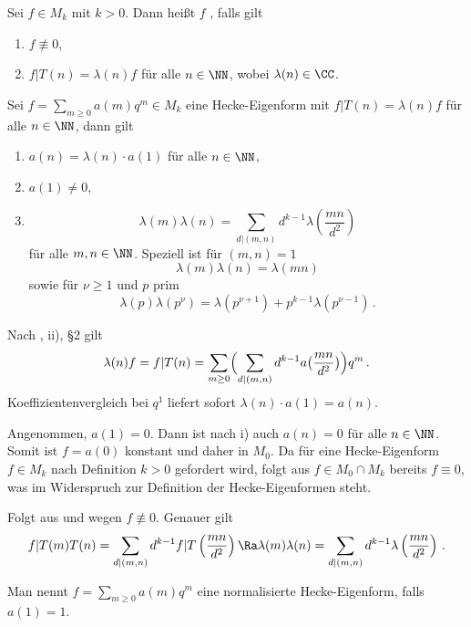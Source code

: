 \begin{defi}
Sei $f \in M_k$ mit $k > 0$. Dann heißt $f$ , falls gilt
\begin{enumerate}
\item $f \not \equiv 0$,
\item $f | T(n) = \lambda(n) f$ für alle $n \in \NN$, wobei $\lambda(n) \in \CC$.
\end{enumerate}
\end{defi}

\begin{satz}
Sei $f = \sum_{m \geq 0} a(m) q^m \in M_k$ eine Hecke-Eigenform mit $f | T(n) = \lambda(n) f$ für alle $n \in \NN$, dann gilt
\begin{enumerate}
\item $a(n) = \lambda(n) \cdot a(1)$ für alle $n \in \NN$,
\item $a(1) \neq 0$, 
\item \[
\lambda(m) \lambda(n) = \sum_{d \vert (m,n)} d^{k-1} \lambda \left( \frac {mn}{d^2} \right)
\]
für alle $m,n \in \NN$. Speziell ist für $(m, n) = 1$
\[
\lambda(m) \lambda(n) = \lambda(mn)
\]
sowie für $\nu \geq 1$ und $p$ prim
\[
\lambda(p) \lambda(p^\nu) = \lambda(p^{\nu+1}) + p^{k-1}\lambda(p^{\nu-1})
\,.
\]
\end{enumerate}
\end{satz}

\begin{bewe-list}
\item Nach , ii), §2 gilt
\[
\lambda(n) f = f | T(n) = \sum_{m \geq 0} \Bigl( \sum_{d \vert (m,n)} d^{k-1} a\bigl( \frac {mn}{d^2} \bigr) \Bigr) q^m
\,.
\]
Koeffizientenvergleich bei $q^1$ liefert sofort $\lambda (n) \cdot a(1) = a(n)$.
\item Angenommen, $a(1) = 0$. Dann ist nach i) auch $a(n) = 0$ für alle $n \in \NN$. Somit ist $f = a(0)$ konstant und daher in $M_0$. Da für eine Hecke-Eigenform $f \in M_k$ nach Definition $k > 0$ gefordert wird, folgt aus $f \in M_0 \cap M_k$ bereits $f \equiv 0$, was im Widerspruch zur Definition der Hecke-Eigenformen steht.
\item Folgt aus  und wegen $f \not \equiv 0$. Genauer gilt
\[
f | T(m) T(n) = \sum_{d \vert (m,n)} d^{k-1} f | T \left( \frac{mn}{d^2} \right) \Ra \lambda(m) \lambda(n) = \sum_{d \vert (m,n)} d^{k-1} \lambda\left(\frac {mn}{d^2}\right)
\,.
\]
\end{bewe-list}

\begin{defi}
Man nennt $f = \sum_{m \geq 0} a(m) q^m$ eine normalisierte Hecke-Eigenform, falls $a(1) = 1$.
\end{defi}

